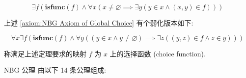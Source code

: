 \begin{axiom}
    \label {axiom:NBG Axiom of Global Choice}
    \[
        \exists f (\mathbf{isfunc} (f) \land \forall x (x \neq \varnothing \implies \exists y (y \in x \land (x,y) \in f)))
    \]
\end{axiom}

上述 \ref{axiom:NBG Axiom of Global Choice} 有个弱化版本如下:

\begin{axiom}
    \label {axiom:NBG Axiom of Choice}
    \[
        \forall x \exists f (\mathbf{isfunc} (f) \land \forall y ((y \in x \land y \neq \varnothing) \implies \exists z ((y,z) \in f \land z \in y)))
    \]
\end{axiom}

称满足上述定理要求的映射 \(f\) 为 \(x\) 上的选择函数 (choice function).

NBG 公理 \cite{TarasBanakh:ClassicalSetTheory} 由以下 14 条公理组成:

